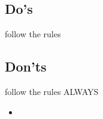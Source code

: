 \subsection{Do's}
\label{sub:dos}
follow the rules
\subsection{Don'ts}
\label{sub:donts}
follow the rules ALWAYS

\begin{itemize}
    \item
\end{itemize}
